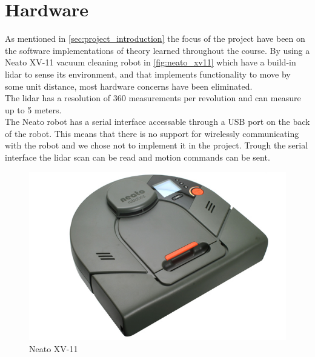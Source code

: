 
\section{Hardware} %
\label{sec:hardware}

As mentioned in \autoref{sec:project_introduction} the focus of the project have been on the software implementations of theory learned throughout the course.
By using a Neato XV-11 vacuum cleaning robot in \autoref{fig:neato_xv11} which have a build-in lidar to sense its environment, and that implements functionality to move by some unit distance, most hardware concerns have been eliminated.\\
The lidar has a resolution of 360 measurements per revolution and can measure up to 5 meters.\\

The Neato robot has a serial interface accessable through a USB port on the back of the robot.
This means that there is no support for wirelessly communicating with the robot and we chose not to implement it in the project.
Trough the serial interface the lidar scan can be read and motion commands can be sent.

\begin{figure}[H]
\centering
\includegraphics[scale=0.40]{images/neato_xv11}
\caption{Neato XV-11}
\label{fig:neato_xv11}
\end{figure}

